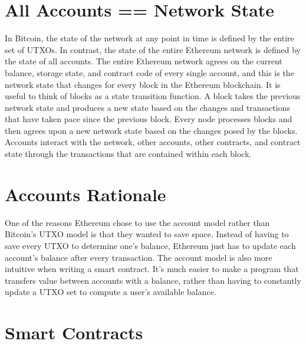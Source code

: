 \documentclass[full.tex]{subfiles}
\begin{document}
    \section*{All Accounts == Network State}
    
    In Bitcoin, the state of the network at any point in time is defined by the entire set of UTXOs. In contrast, the state of the entire Ethereum network is defined by the state of all accounts. The entire Ethereum network agrees on the current balance, storage state, and contract code of every single account, and this is the network state that changes for every block in the Ethereum blockchain. It is useful to think of blocks as a state transition function. A block takes the previous network state and produces a new state based on the changes and transactions that have taken pace since the previous block. Every node processes blocks and then agrees upon a new network state based on the changes posed by the blocks. Accounts interact with the network, other accounts, other contracts, and contract state through the transactions that are contained within each block.
    
    \section*{Accounts Rationale}
    
    One of the reasons Ethereum chose to use the account model rather than Bitcoin's UTXO model is that they wanted to save space. Instead of having to save every UTXO to determine one's balance, Ethereum just has to update each account's balance after every transaction. The account model is also more intuitive when writing a smart contract. It's much easier to make a program that transfers value between accounts with a balance, rather than having to constantly update a UTXO set to compute a user's available balance. 
    
    \section*{Smart Contracts}
    
\end{document}
